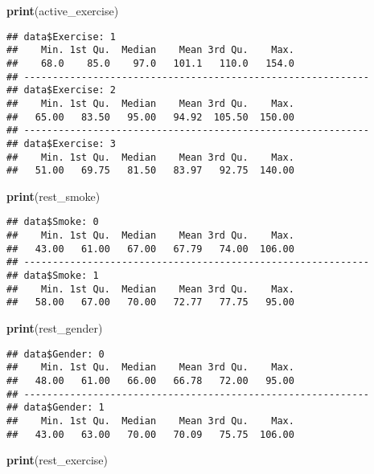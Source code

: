 \documentclass[
]{article}
\newenvironment{Shaded}{\begin{snugshade}}{\end{snugshade}}
\newcommand{\FunctionTok}[1]{\textcolor[rgb]{0.13,0.29,0.53}{\textbf{#1}}}
\newcommand{\NormalTok}[1]{#1}
\begin{document}
\begin{Shaded}
\begin{Highlighting}[]
\FunctionTok{print}\NormalTok{(active\_exercise)}
\end{Highlighting}
\end{Shaded}

\begin{verbatim}
## data$Exercise: 1
##    Min. 1st Qu.  Median    Mean 3rd Qu.    Max. 
##    68.0    85.0    97.0   101.1   110.0   154.0 
## ------------------------------------------------------------ 
## data$Exercise: 2
##    Min. 1st Qu.  Median    Mean 3rd Qu.    Max. 
##   65.00   83.50   95.00   94.92  105.50  150.00 
## ------------------------------------------------------------ 
## data$Exercise: 3
##    Min. 1st Qu.  Median    Mean 3rd Qu.    Max. 
##   51.00   69.75   81.50   83.97   92.75  140.00
\end{verbatim}

\begin{Shaded}
\begin{Highlighting}[]
\FunctionTok{print}\NormalTok{(rest\_smoke)}
\end{Highlighting}
\end{Shaded}

\begin{verbatim}
## data$Smoke: 0
##    Min. 1st Qu.  Median    Mean 3rd Qu.    Max. 
##   43.00   61.00   67.00   67.79   74.00  106.00 
## ------------------------------------------------------------ 
## data$Smoke: 1
##    Min. 1st Qu.  Median    Mean 3rd Qu.    Max. 
##   58.00   67.00   70.00   72.77   77.75   95.00
\end{verbatim}

\begin{Shaded}
\begin{Highlighting}[]
\FunctionTok{print}\NormalTok{(rest\_gender)}
\end{Highlighting}
\end{Shaded}

\begin{verbatim}
## data$Gender: 0
##    Min. 1st Qu.  Median    Mean 3rd Qu.    Max. 
##   48.00   61.00   66.00   66.78   72.00   95.00 
## ------------------------------------------------------------ 
## data$Gender: 1
##    Min. 1st Qu.  Median    Mean 3rd Qu.    Max. 
##   43.00   63.00   70.00   70.09   75.75  106.00
\end{verbatim}

\begin{Shaded}
\begin{Highlighting}[]
\FunctionTok{print}\NormalTok{(rest\_exercise)}
\end{Highlighting}
\end{Shaded}
\end{document}
